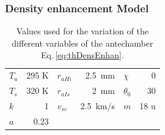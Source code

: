 		\subsubsection{Density enhancement Model}\label{subsubsec:Densenhan}
		\begin{table}
			\begin{center}
				\begin{tabular}{|l r |l r |l r|}
					\hline
					$T_a$ 	& 295 K	& $r_{aHi}$	& 2.5\, mm	& $\chi$	& 0\degree \\
					$T_s$ 	& 320 K & $r_{aIs}$ & 2\, mm	& $\theta_0$& 30\degree\\	
					$k$		&	1	& $v_{sc}$	& 2.5\, km/s& $m$		& 18 u\\
					$a$		& 0.23	&			&			&			&	\\
					\hline
				\end{tabular}
			\end{center}
			\caption{Values used for the variation of the different variables of the antechamber Eq.\,\eqref{eq:thDensEnhan}.}
			\label{tab:thDensEnhan}
		\end{table}
		
